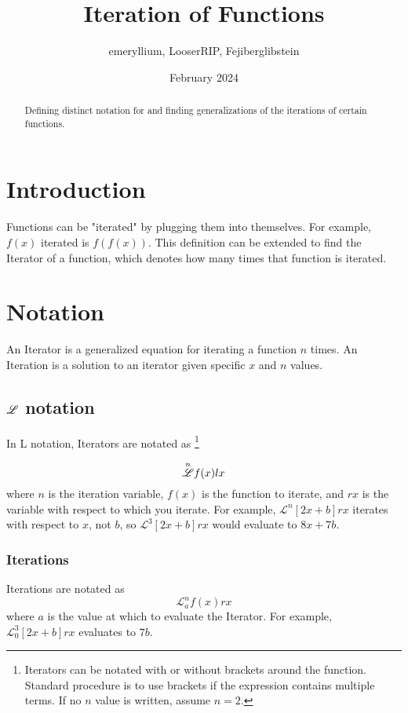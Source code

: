 \documentclass[10pt, letterpaper]{article}
\title{Iteration of Functions}
\author{emeryllium, LooserRIP, Fejiberglibstein}
\date{February 2024}
\begin{document}
\maketitle

\begin{abstract}
    Defining distinct notation for and finding generalizations of the iterations of certain functions.
\end{abstract}

\tableofcontents

\newpage

\section{Introduction}
Functions can be "iterated" by plugging them into themselves. For example, $f(x)$ iterated is $f(f(x))$. This definition can be extended to find the Iterator of a function, which denotes how many times that function is iterated.

\section{Notation}
An Iterator is a generalized equation for iterating a function $n$ times. An Iteration is a solution to an iterator given specific $x$ and $n$ values.

\subsection{$\overset{}{\mathscr{L}}$ notation}
In L notation, Iterators are notated as
    \footnote{Iterators can be notated with or without brackets around the function. Standard procedure is to use brackets if the expression contains multiple terms. If no $n$ value is written, assume $n=2$.}

$$ \overset{n}{\mathscr{L}} f(x) lx$$
where $n$ is the iteration variable, $f(x)$ is the function to iterate, and $rx$ is the variable with respect to which you iterate. For example, $\mathscr{L}^n [2x+b] rx$
iterates with respect to $x$, not $b$, so $\mathscr{L}^3 [2x+b] rx$ would evaluate to $8x+7b$.

\subsubsection{Iterations}
Iterations are notated as
$$\mathscr{L}^n_a f(x) rx$$
where $a$ is the value at which to evaluate the Iterator. For example, $\mathscr{L}^3_0 [2x+b] rx$ evaluates to $7b$.
\end{document}
